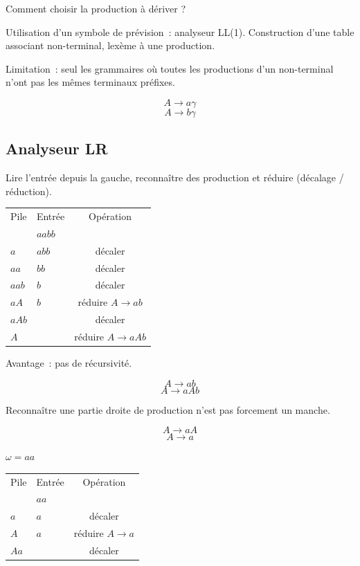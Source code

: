 \documentclass{beamer}
\begin{document}
\begin{frame}
 Comment choisir la production à dériver ?

 Utilisation d'un symbole de prévision~: analyseur LL(1). Construction d'une table associant non-terminal, lexème à une production.

 Limitation~: seul les grammaires où toutes les productions d'un non-terminal n'ont pas les mêmes terminaux préfixes.

 $$ A \rightarrow a \gamma $$
 $$ A \rightarrow b \gamma $$
\end{frame}


\subsection{Analyseur LR}

\begin{frame}
	Lire l'entrée depuis la gauche, reconnaître des production et réduire (décalage / réduction).

	\begin{center}
		\begin{tabular}{|l|l|c|}
			\hline
			Pile & Entrée & Opération \\
			& $aabb$ &  \\
			$a$ & $abb$ & décaler \\
			$aa$ & $bb$ & décaler \\
			$aab$ & $b$ & décaler \\
			$aA$ & $b$ & réduire $A \rightarrow ab$ \\
			$aAb$ & & décaler \\
			$A$ & & réduire $A \rightarrow aAb$ \\
			\hline
		\end{tabular}
	\end{center}

	Avantage~: pas de récursivité.

	$$ A \rightarrow ab$$
	$$ A \rightarrow aAb $$

\end{frame}

\begin{frame}
	Reconnaître une partie droite de production n'est pas forcement un manche.

	$$ A \rightarrow aA $$
	$$ A \rightarrow a $$

	$\omega = aa$
	\begin{center}
		\begin{tabular}{|l|l|c|}
			\hline
			Pile & Entrée & Opération \\
			& $aa$ &  \\
			$a$ & $a$ & décaler \\
			$A$ & $a$ & réduire $A \rightarrow a$ \\
			$Aa$ & & décaler \\
			\hline
		\end{tabular}
	\end{center}

\end{frame}
\end{document}
